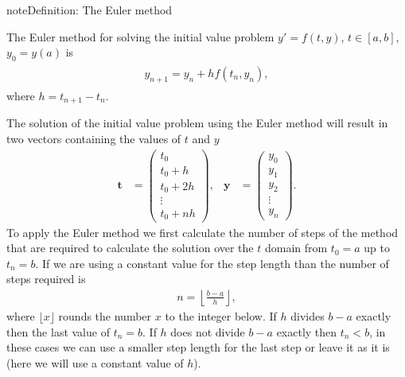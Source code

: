 \documentclass[letterpaper,10pt,english]{jupyterBook}
\begin{document}
\begin{sphinxadmonition}{note}{Definition: The Euler method}

\sphinxAtStartPar
The Euler method for solving the initial value problem \(y' = f(t, y)\), \(t \in [a, b]\), \(y_0 = y(a)\) is
\begin{equation}\label{equation:1_IVPs/1.2_Euler_Method:euler-method-equation}
\begin{split}\begin{align}
y_{n+1} = y_n + h f(t_n ,y_n),
\end{align}\end{split}
\end{equation}
\sphinxAtStartPar
where \(h = t_{n+1} - t_n\).
\end{sphinxadmonition}

\sphinxAtStartPar
The solution of the initial value problem using the Euler method will result in two vectors containing the values of \(t\) and \(y\)
\begin{align*}
    \mathbf{t} &= \begin{pmatrix} t_0 \\ t_0 + h \\ t_0 + 2h \\ \vdots \\ t_0 + nh \end{pmatrix}, &
    \mathbf{y} &= \begin{pmatrix} y_0 \\ y_1 \\ y_2 \\ \vdots \\ y_n \end{pmatrix}.
\end{align*}
\sphinxAtStartPar
To apply the Euler method we first calculate the number of steps of the method that are required to calculate the solution over the \(t\) domain from \(t_0 = a\) up to \(t_n = b\). If we are using a constant value for the step length than the number of steps required is
\begin{equation*}
\begin{split}n = \left\lfloor \frac{b - a}{h} \right\rfloor,\end{split}
\end{equation*}
\sphinxAtStartPar
where \(\lfloor x \rfloor\) rounds the number \(x\) to the integer below. If \(h\) divides \(b - a\) exactly then the last value of \(t_n = b\). If \(h\) does not divide \(b - a\) exactly then \(t_n < b\), in these cases we can use a smaller step length for the last step or leave it as it is (here we will use a constant value of \(h\)).
\end{document}
